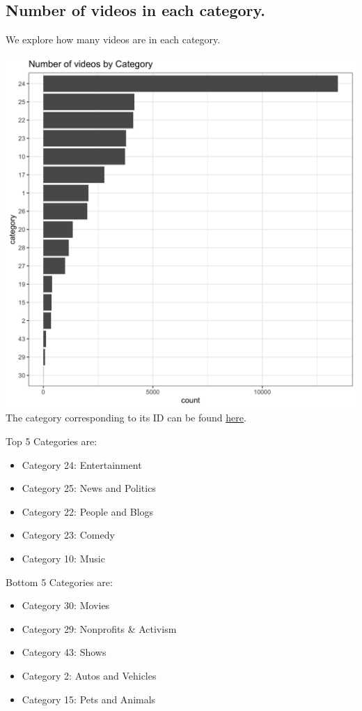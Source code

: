 \documentclass[]{article}
\providecommand{\tightlist}{%
  \setlength{\itemsep}{0pt}\setlength{\parskip}{0pt}}
\begin{document}
\hypertarget{number-of-videos-in-each-category.}{%
\subsection{Number of videos in each
category.}\label{number-of-videos-in-each-category.}}

We explore how many videos are in each category.

\includegraphics{../images/num_vids_category.png} The category
corresponding to its ID can be found
\href{https://developers.google.com/youtube/v3/docs/videoCategories/list}{here}.

Top 5 Categories are:

\begin{itemize}
\tightlist
\item
  Category 24: Entertainment
\item
  Category 25: News and Politics
\item
  Category 22: People and Blogs
\item
  Category 23: Comedy
\item
  Category 10: Music
\end{itemize}

Bottom 5 Categories are:

\begin{itemize}
\tightlist
\item
  Category 30: Movies
\item
  Category 29: Nonprofits \& Activism
\item
  Category 43: Shows
\item
  Category 2: Autos and Vehicles
\item
  Category 15: Pets and Animals
\end{itemize}
\end{document}
